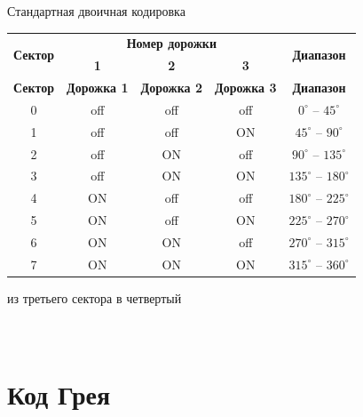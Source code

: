 \begin{frame}{Стандартная двоичная кодировка}
    \begin{longtable}[c]{|c|c|c|c|c|}
        \hline
        \multirow{2}{*}{\textbf{Сектор}} & \multicolumn{3}{|c|}{\textbf{Номер дорожки}} & \multirow{2}{*}{\textbf{Диапазон}}\\
        \cline{2-4}
        & \textbf{1} & \textbf{2} & \textbf{3} &\\
        \hline
        \endfirsthead
        \hline
        \textbf{Сектор} & \textbf{Дорожка 1} & \textbf{Дорожка 2} & \textbf{Дорожка 3} & \textbf{Диапазон}\\
        \hline
        \endhead
        0 & off & off & off & $0^{\circ}$ -- $45^{\circ}$\\
        \hline
        1 & off & off & \cellcolor{green!20}ON & $45^{\circ}$ -- $90^{\circ}$\\
        \hline
        2 & off & \cellcolor{green!20}ON & off & $90^{\circ}$ -- $135^{\circ}$\\
        \hline
        3 & off & \cellcolor{green!20}ON & \cellcolor{green!20}ON & $135^{\circ}$ -- $180^{\circ}$\\
        \hline
        4 & \cellcolor{green!20}ON & off & off & $180^{\circ}$ -- $225^{\circ}$\\
        \hline
        5 & \cellcolor{green!20}ON & off & \cellcolor{green!20}ON & $225^{\circ}$ -- $270^{\circ}$\\
        \hline
        6 & \cellcolor{green!20}ON & \cellcolor{green!20}ON & off & $270^{\circ}$ -- $315^{\circ}$\\
        \hline
        7 & \cellcolor{green!20}ON & \cellcolor{green!20}ON & \cellcolor{green!20}ON & $315^{\circ}$ -- $360^{\circ}$\\
        \hline
    \end{longtable}
    \begin{exampleblock}{ из третьего сектора в четвертый}
        \centering
        \scriptsize\textbf{\\\\\\}
    \end{exampleblock}
\end{frame}

\section{Код Грея}

